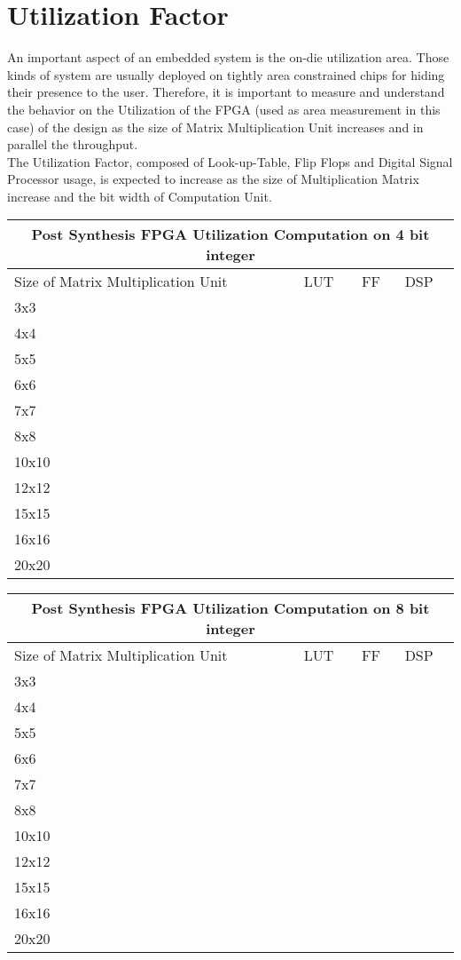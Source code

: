 \section{Utilization Factor}
An important aspect of an embedded system is the on-die utilization area. Those kinds of system are usually deployed on tightly area constrained chips for hiding their presence to the user.
Therefore, it is important to measure and understand the behavior on the Utilization of the FPGA (used as area measurement in this case) of the design as the size of Matrix Multiplication Unit increases and in parallel the throughput.\\
The Utilization Factor, composed of Look-up-Table, Flip Flops and Digital Signal Processor usage, is expected to increase as the size of Multiplication Matrix increase and the bit width of Computation Unit.
\begin{center}
\begin{tabular}{ |p{3cm}||p{3cm}|p{3cm}|p{3cm}| }
\hline
\multicolumn{4}{|c|}{Post Synthesis FPGA Utilization Computation on 4 bit integer } \\
\hline
Size of Matrix Multiplication Unit& LUT &FF&DSP\\
\hline
3x3& & & \\
4x4& & & \\
5x5& & & \\
6x6& & & \\
7x7& & & \\
8x8& & & \\
10x10& & & \\
12x12& & & \\
15x15& & & \\
16x16& & & \\
20x20& & & \\
\hline
\end{tabular}
\label{table:int4ut}
\end{center}

\begin{center}
\begin{tabular}{ |p{3cm}||p{3cm}|p{3cm}|p{3cm}| }
\hline
\multicolumn{4}{|c|}{Post Synthesis FPGA Utilization Computation on 8 bit integer } \\
\hline
Size of Matrix Multiplication Unit& LUT &FF&DSP\\
\hline
3x3& & & \\
4x4& & & \\
5x5& & & \\
6x6& & & \\
7x7& & & \\
8x8& & & \\
10x10& & & \\
12x12& & & \\
15x15& & & \\
16x16& & & \\
20x20& & & \\
\hline
\end{tabular}
\label{table:int8ut}
\end{center}

